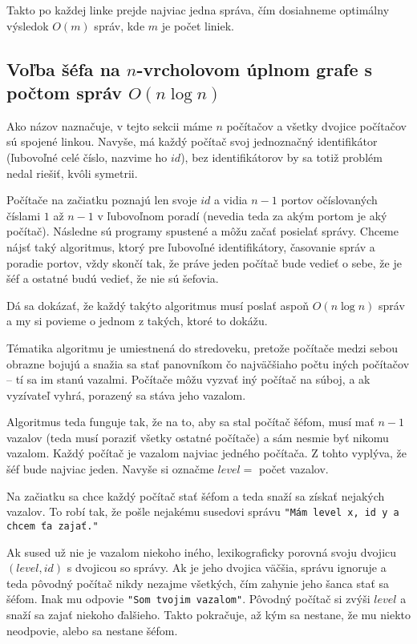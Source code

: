 Takto po každej linke prejde najviac jedna správa, čím dosiahneme optimálny výsledok $O(m)$ správ,
kde $m$ je počet liniek.

\subsection{Voľba šéfa na $n$-vrcholovom úplnom grafe s počtom správ $O(n\log n)$}

Ako názov naznačuje, v tejto sekcii máme $n$ počítačov a všetky dvojice počítačov sú spojené linkou. 
Navyše, má každý počítač svoj jednoznačný identifikátor (ľubovoľné celé číslo, nazvime ho $id$), bez identifikátorov
by sa totiž problém nedal riešiť, kvôli symetrii.

Počítače na začiatku poznajú len svoje $id$ a vidia $n-1$ portov očíslovaných číslami $1$ až $n-1$ v
ľubovoľnom poradí (nevedia teda za akým portom je aký počítač). Následne sú programy spustené a môžu začať posielať správy.
Chceme nájsť taký algoritmus, ktorý pre ľubovoľné identifikátory, časovanie správ a poradie
portov, vždy skončí tak, že práve jeden počítač bude vedieť o sebe, že je šéf a ostatné budú vedieť, že nie sú šefovia.

Dá sa dokázať, že každý takýto algoritmus musí poslať aspoň $O(n\log n)$ správ a my si povieme o
jednom z takých, ktoré to dokážu.

Tématika algoritmu je umiestnená do stredoveku, pretože počítače medzi sebou obrazne bojujú a snažia
sa stať panovníkom čo najväčšiaho počtu iných počítačov -- tí sa im stanú vazalmi. 
Počítače môžu vyzvať iný počítač na súboj, a ak vyzívateľ vyhrá, porazený sa stáva jeho vazalom.

Algoritmus teda funguje tak, že na to, aby sa stal počítač šéfom, musí mať $n-1$ vazalov (teda musí
poraziť všetky ostatné počítače) a sám nesmie byť nikomu vazalom. Každý počítač je vazalom najviac 
jedného počítača. Z tohto vyplýva, že šéf bude najviac jeden. Navyše si označme $level =$  počet vazalov.

Na začiatku sa chce každý počítač stať šéfom a teda snaží sa získať nejakých vazalov. To robí tak,
že pošle nejakému susedovi správu \verb!"Mám level x, id y a chcem ťa zajať."! 

Ak sused už nie je vazalom niekoho iného, lexikograficky porovná svoju dvojicu $(level, id)$ s dvojicou so správy. 
Ak je jeho dvojica väčšia, správu ignoruje a teda pôvodný počítač nikdy nezajme všetkých, čím
zahynie jeho šanca stať sa šéfom. 
Inak mu odpovie \verb!"Som tvojim vazalom"!. Pôvodný počítač si zvýši $level$ a snaží sa zajať niekoho
ďalšieho. Takto pokračuje, až kým sa nestane, že mu niekto neodpovie, alebo sa nestane šéfom.

